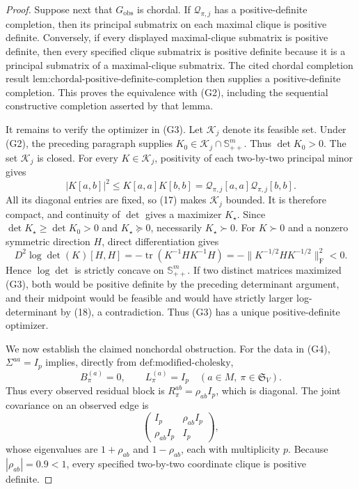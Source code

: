 \documentclass{article}
\begin{document}
\begin{proof}
Suppose next that \(G_{\mathrm{obs}}\) is chordal.  If \(\mathcal Q_{\pi,j}\) has a positive-definite completion, then its principal submatrix on each maximal clique is positive definite.  Conversely, if every displayed maximal-clique submatrix is positive definite, then every specified clique submatrix is positive definite because it is a principal submatrix of a maximal-clique submatrix.  The cited chordal completion result \(\text{lem:chordal-positive-definite-completion}\) then supplies a positive-definite completion.  This proves the equivalence with (G2), including the sequential constructive completion asserted by that lemma.

It remains to verify the optimizer in (G3).  Let \(\mathcal K_j\) denote its feasible set.  Under (G2), the preceding paragraph supplies \(K_0\in\mathcal K_j\cap\mathbb S_{++}^m\).  Thus \(\det K_0>0\).  The set \(\mathcal K_j\) is closed.  For every \(K\in\mathcal K_j\), positivity of each two-by-two principal minor gives
\[
|K[a,b]|^2\le K[a,a]K[b,b]
=\mathcal Q_{\pi,j}[a,a]\mathcal Q_{\pi,j}[b,b].
\tag{17}
\]
All its diagonal entries are fixed, so (17) makes \(\mathcal K_j\) bounded.  It is therefore compact, and continuity of \(\det\) gives a maximizer \(K_\star\).  Since \(\det K_\star\ge\det K_0>0\) and \(K_\star\succeq0\), necessarily \(K_\star\succ0\).  For \(K\succ0\) and a nonzero symmetric direction \(H\), direct differentiation gives
\[
D^2\log\det(K)[H,H]
=-\operatorname{tr}(K^{-1}HK^{-1}H)
=-\lVert K^{-1/2}HK^{-1/2}\rVert_{\mathrm F}^2<0.
\tag{18}
\]
Hence \(\log\det\) is strictly concave on \(\mathbb S_{++}^m\).  If two distinct matrices maximized (G3), both would be positive definite by the preceding determinant argument, and their midpoint would be feasible and would have strictly larger log-determinant by (18), a contradiction.  Thus (G3) has a unique positive-definite optimizer.

We now establish the claimed nonchordal obstruction.  For the data in (G4), \(\Sigma^{aa}=I_p\) implies, directly from \(\text{def:modified-cholesky}\),
\[
B_\pi^{(a)}=0,
\qquad L_\pi^{(a)}=I_p
\quad(a\in M,\ \pi\in\mathfrak S_V).
\tag{19}
\]
Thus every observed residual block is \(R_\pi^{ab}=\rho_{ab}I_p\), which is diagonal.  The joint covariance on an observed edge is
\[
\begin{pmatrix}
I_p&\rho_{ab}I_p\\
\rho_{ab}I_p&I_p
\end{pmatrix},
\tag{20}
\]
whose eigenvalues are \(1+\rho_{ab}\) and \(1-\rho_{ab}\), each with multiplicity \(p\).  Because \(|\rho_{ab}|=0.9<1\), every specified two-by-two coordinate clique is positive definite.


\end{proof}
\end{document}
